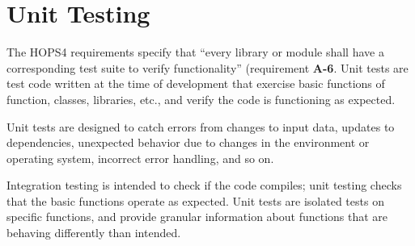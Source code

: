 %
%
\section{Unit Testing}
\label{sec:unit}

The HOPS4 requirements specify that ``every library or module shall have a corresponding test suite to verify functionality'' (requirement \textbf{A-6}. Unit tests are test code written at the time of development that exercise basic functions of function, classes, libraries, etc., and verify the code is functioning as expected.

Unit tests are designed to catch errors from changes to input data, updates to dependencies, unexpected behavior due to changes in the environment or operating system, incorrect error handling, and so on.

Integration testing is intended to check if the code compiles; unit testing checks that the basic functions operate as expected. Unit tests are isolated tests on specific functions, and provide granular information about functions that are behaving differently than intended.





%
%

